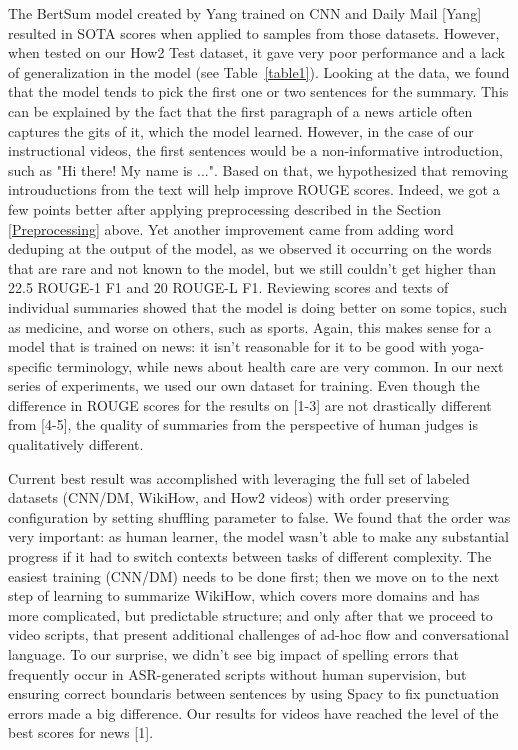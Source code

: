 \documentclass{article}
\begin{document}
The BertSum model created by Yang trained on CNN and Daily Mail [Yang] resulted in SOTA  scores when applied to samples from those datasets. However, when tested on our How2 Test dataset, it gave very poor performance and a lack of generalization in the model (see Table~\ref{table1}). Looking at the data, we found that the model tends to pick the first one or two sentences for the summary. This can be explained by the fact that the first paragraph of a news article often captures the gits of it, which the model learned. However, in the case of our instructional videos, the first sentences would be a non-informative introduction, such as "Hi there! My name is ...". Based on that, we hypothesized that removing introuductions from the text will help improve ROUGE scores. Indeed, we got a few points better after applying  preprocessing described in the Section \ref{Preprocessing} above. Yet another improvement came from adding word deduping at the output of the model, as we observed it occurring on the words that are rare and not known to the model, but we still couldn't get higher than 22.5 ROUGE-1 F1 and 20 ROUGE-L F1. Reviewing scores and texts of individual summaries showed that the model is doing better on some topics, such as medicine, and worse on others, such as sports. Again, this makes sense for a model that is trained on news: it isn't reasonable for it to be good with yoga-specific terminology, while news about health care are very common. In our next series of experiments, we used our own dataset for training.  Even though the difference in ROUGE scores for the results on [1-3] are not drastically different from [4-5], the quality of summaries from the perspective of human judges is qualitatively different.

Current best result was accomplished with leveraging the full set of labeled datasets (CNN/DM, WikiHow, and How2 videos) with order preserving configuration by setting shuffling parameter to false. We found that the order was very important: as human learner, the model wasn't able to make any substantial progress if it had to switch contexts between tasks of different complexity. The easiest training (CNN/DM) needs to be done first; then we move on to the next step of learning to summarize WikiHow, which covers more domains and has more complicated, but predictable structure; and only after that we proceed to video scripts, that present additional challenges of ad-hoc flow and conversational language. To our surprise, we didn't see big impact of spelling errors that frequently occur in ASR-generated scripts without human supervision, but ensuring correct boundaris between sentences by using Spacy to fix punctuation errors made a big difference. Our results for videos have reached the level of the best scores for news [1]. 
\end{document}
